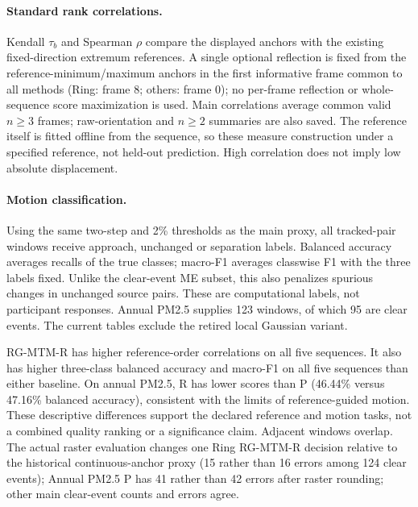 \paragraph{Standard rank correlations.}
Kendall $\tau_b$ and Spearman $\rho$ compare the displayed anchors with the existing fixed-direction extremum references. A single optional reflection is fixed from the reference-minimum/maximum anchors in the first informative frame common to all methods (Ring: frame 8; others: frame 0); no per-frame reflection or whole-sequence score maximization is used. Main correlations average common valid $n\ge3$ frames; raw-orientation and $n\ge2$ summaries are also saved. The reference itself is fitted offline from the sequence, so these measure construction under a specified reference, not held-out prediction. High correlation does not imply low absolute displacement.

\paragraph{Motion classification.}
Using the same two-step and 2\% thresholds as the main proxy, all tracked-pair windows receive approach, unchanged or separation labels. Balanced accuracy averages recalls of the true classes; macro-F1 averages classwise F1 with the three labels fixed. Unlike the clear-event ME subset, this also penalizes spurious changes in unchanged source pairs. These are computational labels, not participant responses. Annual PM2.5 supplies 123 windows, of which 95 are clear events. The current tables exclude the retired local Gaussian variant.


RG-MTM-R has higher reference-order correlations on all five sequences. It also has higher three-class balanced accuracy and macro-F1 on all five sequences than either baseline. On annual PM2.5, R has lower scores than P (46.44\% versus 47.16\% balanced accuracy), consistent with the limits of reference-guided motion. These descriptive differences support the declared reference and motion tasks, not a combined quality ranking or a significance claim. Adjacent windows overlap. The actual raster evaluation changes one Ring RG-MTM-R decision relative to the historical continuous-anchor proxy (15 rather than 16 errors among 124 clear events); Annual PM2.5 P has 41 rather than 42 errors after raster rounding; other main clear-event counts and errors agree.

